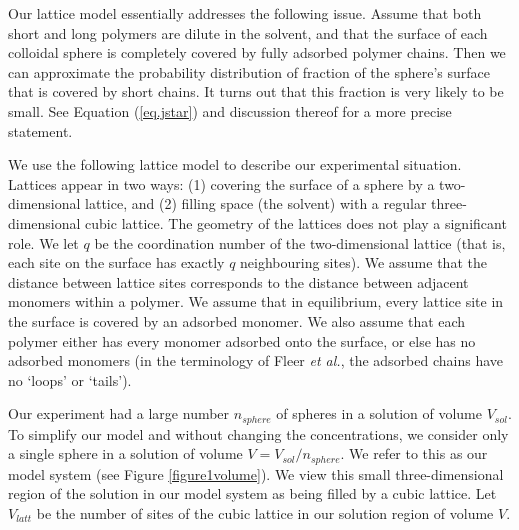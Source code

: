 \documentclass[twoside,twocolumn,9pt]{article}
\begin{document}
Our lattice model essentially addresses
the following issue.
Assume that both short and long polymers 
are dilute in the solvent, and that the 
surface of each colloidal sphere is completely covered 
by fully adsorbed polymer chains.  Then we 
can approximate the probability distribution of  fraction of the sphere's surface that is 
covered by short chains.  It turns out that this 
fraction is very likely to be small.
See  Equation (\ref{eq.jstar}) and discussion thereof for a more precise statement. 


We use the following lattice model to describe our experimental situation.  
Lattices appear in two ways:  (1) covering the surface of a sphere by a two-dimensional lattice, and
(2) filling space (the solvent) with a regular three-dimensional cubic lattice.  
The geometry of the lattices does not play a significant role.  
We let $q$ be the coordination number of the two-dimensional lattice 
(that is, each site on the surface has exactly $q$ neighbouring sites).  We assume that 
the distance between lattice sites corresponds to the distance between adjacent monomers within a polymer.  
We assume that in equilibrium, every lattice site in the surface is covered by an adsorbed monomer.
We also assume that each polymer either has every monomer adsorbed onto the surface, or else has no adsorbed monomers (in the terminology of Fleer \textit{et al.},\cite{Fleer1993} the adsorbed chains
have no `loops' or `tails').

Our experiment had a large number $n_{sphere}$ of spheres in a solution of volume $V_{sol}$.  
To simplify 
our model and without changing the concentrations, we consider only a single sphere in a solution
of volume $V=V_{sol}/n_{sphere}$.  We refer to this as our model system (see Figure \ref{figure1volume}).
We view this small three-dimensional region of the solution in our model system as being filled by a 
cubic lattice.
Let $V_{latt}$ be the number of sites of the cubic 
lattice in our solution region of volume $V$.
\end{document}
